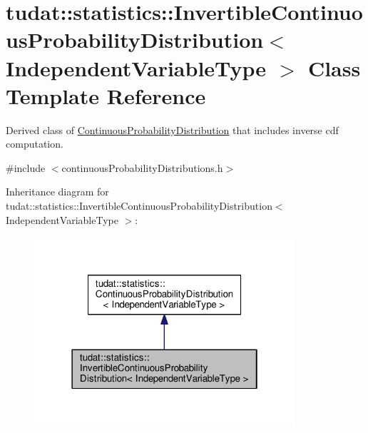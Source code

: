 \hypertarget{classtudat_1_1statistics_1_1InvertibleContinuousProbabilityDistribution}{}\section{tudat\+:\+:statistics\+:\+:Invertible\+Continuous\+Probability\+Distribution$<$ Independent\+Variable\+Type $>$ Class Template Reference}
\label{classtudat_1_1statistics_1_1InvertibleContinuousProbabilityDistribution}


Derived class of \hyperlink{classtudat_1_1statistics_1_1ContinuousProbabilityDistribution}{Continuous\+Probability\+Distribution} that includes inverse cdf computation.  




{\ttfamily \#include $<$continuous\+Probability\+Distributions.\+h$>$}



Inheritance diagram for tudat\+:\+:statistics\+:\+:Invertible\+Continuous\+Probability\+Distribution$<$ Independent\+Variable\+Type $>$\+:
\nopagebreak
\begin{figure}[H]
\begin{center}
\leavevmode
\includegraphics[width=274pt]{classtudat_1_1statistics_1_1InvertibleContinuousProbabilityDistribution__inherit__graph}
\end{center}
\end{figure}


